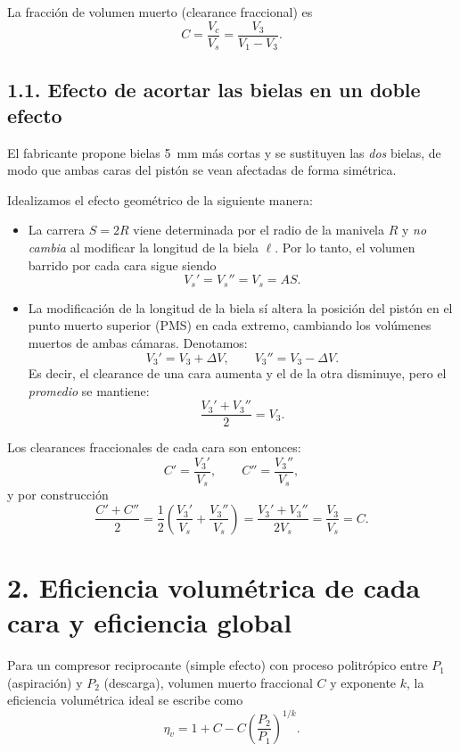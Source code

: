 \documentclass[11pt,a4paper]{article}
\begin{document}
La fracción de volumen muerto (clearance fraccional) es
\[
C = \frac{V_c}{V_s} = \frac{V_3}{V_1 - V_3}.
\]

\subsection*{1.1. Efecto de acortar las bielas en un doble efecto}

El fabricante propone bielas \SI{5}{mm} más cortas y se sustituyen las \emph{dos}
bielas, de modo que ambas caras del pistón se vean afectadas de forma
simétrica.

Idealizamos el efecto geométrico de la siguiente manera:

\begin{itemize}
  \item La carrera $S = 2R$ viene determinada por el radio de la manivela $R$ y
        \emph{no cambia} al modificar la longitud de la biela $\ell$. Por lo tanto,
        el volumen barrido por cada cara sigue siendo
        \[
          V_s' = V_s'' = V_s = A S.
        \]
  \item La modificación de la longitud de la biela sí altera la posición del
        pistón en el punto muerto superior (PMS) en cada extremo, cambiando los
        volúmenes muertos de ambas cámaras. Denotamos:
        \[
          V_3' = V_3 + \Delta V,\qquad
          V_3'' = V_3 - \Delta V.
        \]
        Es decir, el clearance de una cara aumenta y el de la otra disminuye,
        pero el \emph{promedio} se mantiene:
        \[
          \frac{V_3' + V_3''}{2} = V_3.
        \]
\end{itemize}

Los clearances fraccionales de cada cara son entonces:
\[
C' = \frac{V_3'}{V_s},\qquad
C'' = \frac{V_3''}{V_s},
\]
y por construcción
\[
\frac{C' + C''}{2}
= \frac{1}{2}\left(\frac{V_3'}{V_s} + \frac{V_3''}{V_s}\right)
= \frac{V_3'+V_3''}{2V_s}
= \frac{V_3}{V_s}
= C.
\]

\section*{2. Eficiencia volumétrica de cada cara y eficiencia global}

Para un compresor reciprocante (simple efecto) con proceso politrópico entre
$P_1$ (aspiración) y $P_2$ (descarga), volumen muerto fraccional $C$ y
exponente $k$, la eficiencia volumétrica ideal se escribe como
\[
\eta_v = 1 + C - C\left(\frac{P_2}{P_1}\right)^{1/k}.
\]
\end{document}
